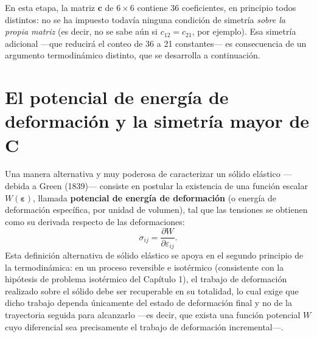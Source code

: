 En esta etapa, la matriz $\bm c$ de $6\times 6$ contiene 36 coeficientes, en principio todos distintos: no se ha impuesto todavía ninguna condición de simetría \emph{sobre la propia matriz} (es decir, no se sabe aún si $c_{12}=c_{21}$, por ejemplo). Esa simetría adicional —que reducirá el conteo de 36 a 21 constantes— es consecuencia de un argumento termodinámico distinto, que se desarrolla a continuación.

\section{El potencial de energía de deformación y la simetría mayor de \texorpdfstring{$\bm C$}{C}}
\label{sec:cap03-potencial-energia}

Una manera alternativa y muy poderosa de caracterizar un sólido elástico —debida a Green (1839)— consiste en postular la existencia de una función escalar $W(\bm\varepsilon)$, llamada \textbf{potencial de energía de deformación} (o energía de deformación específica, por unidad de volumen), tal que las tensiones se obtienen como su derivada respecto de las deformaciones:
\[
\sigma_{ij} = \frac{\partial W}{\partial \varepsilon_{ij}}.
\]
Esta definición alternativa de sólido elástico se apoya en el segundo principio de la termodinámica: en un proceso reversible e isotérmico (consistente con la hipótesis de problema isotérmico del Capítulo 1), el trabajo de deformación realizado sobre el sólido debe ser recuperable en su totalidad, lo cual exige que dicho trabajo dependa únicamente del estado de deformación final y no de la trayectoria seguida para alcanzarlo —es decir, que exista una función potencial $W$ cuyo diferencial sea precisamente el trabajo de deformación incremental—.

